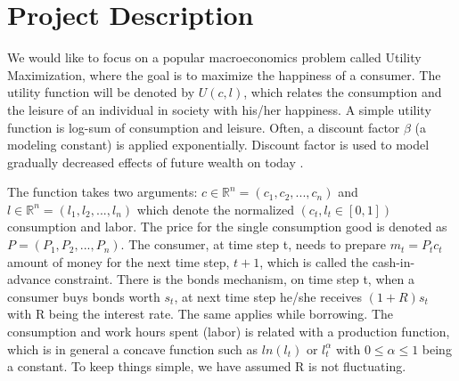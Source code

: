 \section*{Project Description}\label{ch:ch1label}

We would like to focus on a popular macroeconomics problem called Utility Maximization, where the goal is to maximize the happiness of a consumer. The utility function will be denoted by $ U(c,l) $, which relates the consumption and the leisure of an individual in society with his/her happiness. A simple utility function is log-sum of consumption and leisure. Often, a discount factor $\beta$ (a modeling constant) is applied exponentially. Discount factor is used to model gradually decreased effects of future wealth on today \cite{Macroeconomics}.

The function takes two arguments: $ c \in \mathbb{R}^n = (c_1,c_2,...,c_n)$ and $ l \in \mathbb{R}^n = (l_1,l_2,...,l_n) $ which denote the normalized $(c_t,l_t \in [0,1])$ consumption and labor. The price for the single consumption good is denoted as $ P = (P_1,P_2,...,P_n)  $. The consumer, at time step t, needs to prepare $m_t = P_tc_t$ amount of money for the next time step, $t+1$, which is called the cash-in-advance constraint. There is the bonds mechanism, on time step t, when a consumer buys bonds worth $s_t$, at next time step he/she receives $(1+R)s_t$ with R being the interest rate. The same applies while borrowing. The consumption and work hours spent (labor) is related with a production function, which is in general a concave function such as $ln(l_t)$ or $l_t^\alpha$ with $0 \leq \alpha \leq 1$ being a constant. To keep things simple, we have assumed R is not fluctuating.

